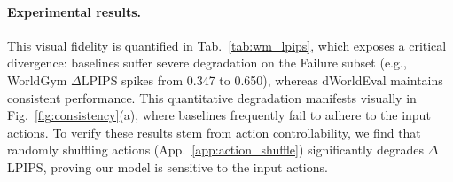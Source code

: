\paragraph{Experimental results.}
This visual fidelity is quantified in Tab.~\ref{tab:wm_lpips}, which exposes a critical divergence: baselines suffer severe degradation on the Failure subset (e.g., WorldGym $\Delta$LPIPS spikes from 0.347 to 0.650), whereas dWorldEval maintains consistent performance. This quantitative degradation manifests visually in Fig.~\ref{fig:consistency}(a), where baselines frequently fail to adhere to the input actions.
To verify these results stem from action controllability, we find that randomly shuffling actions (App.~\ref{app:action_shuffle}) significantly degrades $\Delta$LPIPS, proving our model is sensitive to the input actions.


